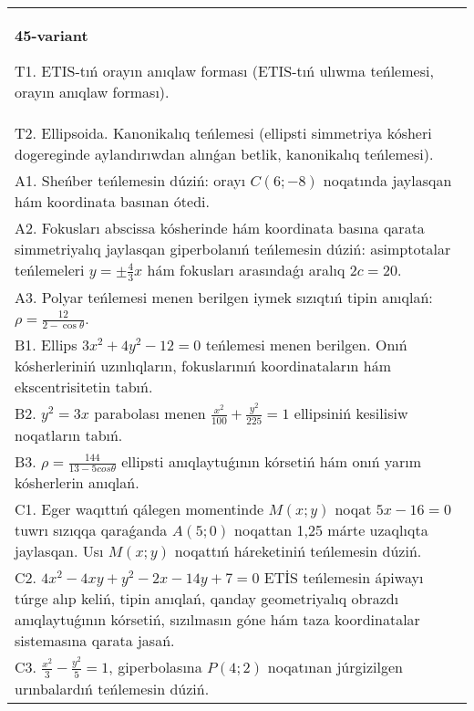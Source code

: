 \documentclass{article}
\begin{document}
\begin{tabular}{m{17cm}}
\textbf{45-variant}
\newline

T1. ETIS-tıń orayın anıqlaw forması (ETIS-tıń ulıwma teńlemesi, orayın anıqlaw forması).\\

T2. Ellipsoida. Kanonikalıq teńlemesi (ellipsti simmetriya kósheri dogereginde aylandırıwdan alınǵan betlik, kanonikalıq teńlemesi).\\

A1. Sheńber teńlemesin dúziń: orayı $C (6 ;-8) $ noqatında jaylasqan hám koordinata basınan ótedi.\\

A2. Fokusları abscissa kósherinde hám koordinata basına qarata simmetriyalıq jaylasqan giperbolanıń teńlemesin dúziń: asimptotalar teńlemeleri $y=\pm \frac{4}{3}x$ hám fokusları arasındaǵı aralıq $2 c=20$.\\

A3. Polyar teńlemesi menen berilgen iymek sızıqtıń tipin anıqlań: $\rho=\frac{12}{2-\cos\theta}$.\\

B1. Ellips $3x^{2} + 4y^{2} - 12 = 0$ teńlemesi menen berilgen. Onıń kósherleriniń uzınlıqların, fokuslarınıń koordinataların hám ekscentrisitetin tabıń.  \\

B2. $y^{2} = 3x$ parabolası menen $\frac{x^{2}}{100} + \frac{y^{2}}{225} = 1$ ellipsiniń kesilisiw noqatların tabıń.  \\

B3. $\rho = \frac{144}{13 - 5cos\theta}$ ellipsti anıqlaytuǵının kórsetiń hám onıń yarım kósherlerin anıqlań.\\

C1. Eger waqıttıń qálegen momentinde $M(x;y)$ noqat $5x - 16 = 0$ tuwrı sızıqqa qaraǵanda $A(5;0)$ noqattan 1,25 márte uzaqlıqta jaylasqan. Usı $M(x;y)$ noqattıń háreketiniń teńlemesin dúziń.  \\

C2. $4x^{2} - 4xy + y^{2} - 2x - 14y + 7 = 0$ ETİS teńlemesin ápiwayı túrge alıp keliń, tipin anıqlań, qanday geometriyalıq obrazdı anıqlaytuǵının kórsetiń, sızılmasın góne hám taza koordinatalar sistemasına qarata jasań.  \\

C3. $\frac{x^{2}}{3} - \frac{y^{2}}{5} = 1$, giperbolasına $P(4;2)$ noqatınan júrgizilgen urınbalardıń teńlemesin dúziń.  \\

\end{tabular}
\vspace{1cm}
\end{document}

